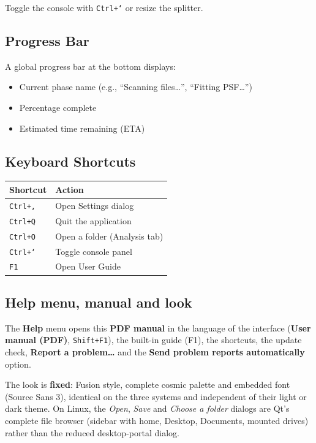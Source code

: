 \documentclass[11pt,a4paper]{article}
\newcommand{\menu}[1]{\textsf{\textbf{\textcolor{sky}{#1}}}}
\begin{document}
Toggle the console with \texttt{Ctrl+`} or resize the splitter.

\subsection{Progress Bar}

A global progress bar at the bottom displays:
\begin{itemize}
    \item Current phase name (e.g., ``Scanning files\ldots'', ``Fitting PSF\ldots'')
    \item Percentage complete
    \item Estimated time remaining (ETA)
\end{itemize}

\subsection{Keyboard Shortcuts}

\begin{center}
\begin{tabular}{ll}
\toprule
\textbf{Shortcut} & \textbf{Action} \\
\midrule
\texttt{Ctrl+,} & Open Settings dialog \\
\texttt{Ctrl+Q} & Quit the application \\
\texttt{Ctrl+O} & Open a folder (Analysis tab) \\
\texttt{Ctrl+`} & Toggle console panel \\
\texttt{F1} & Open User Guide \\
\bottomrule
\end{tabular}
\end{center}


\subsection{Help menu, manual and look}

The \menu{Help} menu opens this \textbf{PDF manual} in the language of the
interface (\menu{User manual (PDF)}, \texttt{Shift+F1}), the built-in guide (F1),
the shortcuts, the update check, \menu{Report a problem\dots} and the
\menu{Send problem reports automatically} option.

The look is \textbf{fixed}: Fusion style, complete cosmic palette and embedded
font (Source Sans 3), identical on the three systems and independent of their
light or dark theme. On Linux, the \emph{Open}, \emph{Save} and \emph{Choose a
folder} dialogs are Qt's complete file browser (sidebar with home, Desktop,
Documents, mounted drives) rather than the reduced desktop-portal dialog.
\end{document}
